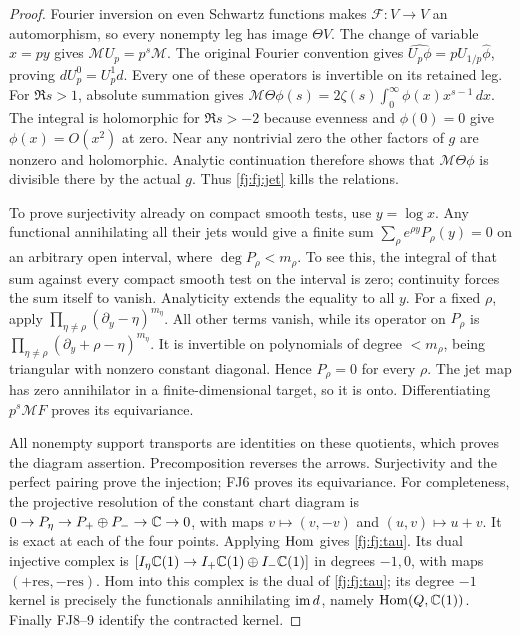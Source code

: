 \begin{proof}
Fourier inversion on even Schwartz functions makes $\mathcal F:V\to V$
an automorphism, so every nonempty leg has image $\Theta V$.
The change of variable $x=py$ gives $\mathcal MU_p=p^s\mathcal M$.
The original Fourier convention gives
$\widehat{U_p\phi}=pU_{1/p}\widehat\phi$, proving $dU_p^0=U_p^1d$.
Every one of these operators is invertible on its retained leg.
For $\Re s>1$, absolute summation gives
$\mathcal M\Theta\phi(s)=2\zeta(s)\int_0^\infty\phi(x)x^{s-1}\,dx$.
The integral is holomorphic for $\Re s>-2$ because evenness and
$\phi(0)=0$ give $\phi(x)=O(x^2)$ at zero. Near any nontrivial
zero the other factors of $g$ are nonzero and holomorphic. Analytic
continuation therefore shows that $\mathcal M\Theta\phi$ is divisible
there by the actual $g$. Thus \eqref{fj:fj:jet} kills the relations.

To prove surjectivity already on compact smooth tests, use $y=\log x$.
Any functional annihilating all their jets would give a finite sum
$\sum_\rho e^{\rho y}P_\rho(y)=0$ on an arbitrary open interval,
where $\deg P_\rho<m_\rho$. To see this, the integral of that sum
against every compact smooth test on the interval is zero; continuity
forces the sum itself to vanish. Analyticity extends the equality to
all $y$. For a fixed $\rho$, apply
$\prod_{\eta\ne\rho}(\partial_y-\eta)^{m_\eta}$.
All other terms vanish, while its operator on $P_\rho$ is
$\prod_{\eta\ne\rho}(\partial_y+\rho-\eta)^{m_\eta}$.
It is invertible on polynomials of degree $<m_\rho$, being triangular
with nonzero constant diagonal. Hence $P_\rho=0$ for every $\rho$.
The jet map has zero annihilator in a finite-dimensional target, so
it is onto. Differentiating $p^s\mathcal MF$ proves its equivariance.

All nonempty support transports are identities on these quotients,
which proves the diagram assertion. Precomposition reverses the arrows.
Surjectivity and the perfect pairing prove the injection; FJ6 proves
its equivariance. For completeness, the projective resolution of the
constant chart diagram is
$0\to P_\eta\to P_+\oplus P_-\to\mathbb C\to0$, with maps
$v\mapsto(v,-v)$ and $(u,v)\mapsto u+v$.
It is exact at each of the four points. Applying $\operatorname{Hom}$ gives
\eqref{fj:fj:tau}. Its dual injective complex is
$[I_\eta\mathbb C(1)\to I_+\mathbb C(1)\oplus I_-\mathbb C(1)]$ in degrees $-1,0$,
with maps $(+\mathrm{res},-\mathrm{res})$.
Hom into this complex is the dual of \eqref{fj:fj:tau}; its degree $-1$
kernel is precisely the functionals annihilating $\operatorname{im} d$, namely
$\operatorname{Hom}(Q,\mathbb C(1))$. Finally FJ8--9 identify the contracted kernel.
\end{proof}

